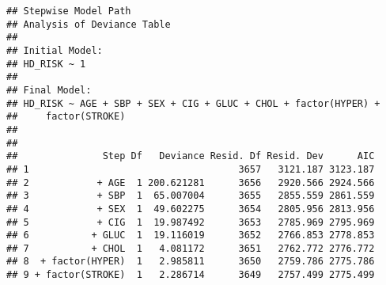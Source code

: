 \documentclass[]{article}
\newenvironment{Shaded}{\begin{snugshade}}{\end{snugshade}}
\newcommand{\DataTypeTok}[1]{\textcolor[rgb]{0.13,0.29,0.53}{#1}}
\newcommand{\DecValTok}[1]{\textcolor[rgb]{0.00,0.00,0.81}{#1}}
\newcommand{\KeywordTok}[1]{\textcolor[rgb]{0.13,0.29,0.53}{\textbf{#1}}}
\newcommand{\NormalTok}[1]{#1}
\newcommand{\OperatorTok}[1]{\textcolor[rgb]{0.81,0.36,0.00}{\textbf{#1}}}
\newcommand{\OtherTok}[1]{\textcolor[rgb]{0.56,0.35,0.01}{#1}}
\newcommand{\StringTok}[1]{\textcolor[rgb]{0.31,0.60,0.02}{#1}}
\begin{document}
\begin{Shaded}
\end{Shaded}

\begin{verbatim}
## Stepwise Model Path 
## Analysis of Deviance Table
## 
## Initial Model:
## HD_RISK ~ 1
## 
## Final Model:
## HD_RISK ~ AGE + SBP + SEX + CIG + GLUC + CHOL + factor(HYPER) + 
##     factor(STROKE)
## 
## 
##               Step Df   Deviance Resid. Df Resid. Dev      AIC
## 1                                     3657   3121.187 3123.187
## 2            + AGE  1 200.621281      3656   2920.566 2924.566
## 3            + SBP  1  65.007004      3655   2855.559 2861.559
## 4            + SEX  1  49.602275      3654   2805.956 2813.956
## 5            + CIG  1  19.987492      3653   2785.969 2795.969
## 6           + GLUC  1  19.116019      3652   2766.853 2778.853
## 7           + CHOL  1   4.081172      3651   2762.772 2776.772
## 8  + factor(HYPER)  1   2.985811      3650   2759.786 2775.786
## 9 + factor(STROKE)  1   2.286714      3649   2757.499 2775.499
\end{verbatim}
\end{document}

